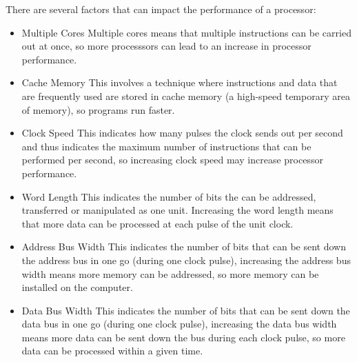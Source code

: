   \noindent
  There are several factors that can impact the performance of a processor:
  \begin{itemize}
    \setlength{\itemsep}{0em}
    \item Multiple Cores
      \subitem Multiple cores means that multiple instructions can be carried out at once, so more processsors can lead to an increase in processor performance.
    \item Cache Memory
      \subitem This involves a technique where instructions and data that are frequently used are stored in cache memory (a high-speed temporary area of memory), so programs run faster.
    \item Clock Speed
      \subitem This indicates how many pulses the clock sends out per second and thus indicates the maximum number of instructions that can be performed per second, so increasing clock speed may increase processor performance.
    \item Word Length
      \subitem This indicates the number of bits the can be addressed, transferred or manipulated as one unit. Increasing the word length means that more data can be processed at each pulse of the unit clock.
    \item Address Bus Width
      \subitem This indicates the number of bits that can be sent down the address bus in one go (during one clock pulse), increasing the address bus width means more memory can be addressed, so more memory can be installed on the computer.
    \item Data Bus Width
      \subitem This indicates the number of bits that can be sent down the data bus in one go (during one clock pulse), increasing the data bus width means more data can be sent down the bus during each clock pulse, so more data can be processed within a given time.
  \end{itemize}
